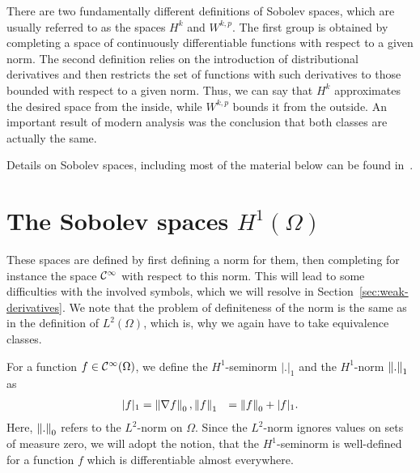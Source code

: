
\begin{intro}
  There are two fundamentally different definitions of Sobolev spaces,
  which are usually referred to as the spaces $H^k$ and $W^{k,p}$. The
  first group is obtained by completing a space of continuously
  differentiable functions with respect to a given norm. The second
  definition relies on the introduction of distributional derivatives
  and then restricts the set of functions with such derivatives to
  those bounded with respect to a given norm. Thus, we can say that
  $H^k$ approximates the desired space from the inside, while
  $W^{k,p}$ bounds it from the outside. An important result of modern
  analysis was the conclusion that both classes are actually the same.

  Details on Sobolev spaces, including most of the material below can
  be found in~\cite{AdamsFournier03}.
\end{intro}

\section{The Sobolev spaces $H^1(\Omega)$}
\label{sec:h1}

\begin{intro}
  These spaces are defined by first defining a norm for them, then
  completing for instance the space $\mathcal C^\infty$ with respect to this
  norm. This will lead to some difficulties with the involved symbols,
  which we will resolve in Section~\ref{sec:weak-derivatives}. We note
  that the problem of definiteness of the norm is the same as in the
  definition of $L^2(\Omega)$, which is, why we again have to take
  equivalence classes.
\end{intro}

\begin{definition}
  For a function $f\in \mathcal C^\infty(\Omega)$, we define the
  $H^1$-seminorm $|.|_1$ and the $H^1$-norm $\left\|.\right\|_1$ as
  \begin{align}
    |f|_1 &= \left\|\nabla f\right\|_0,
    \left\|f\right\|_1 &= \left\|f\right\|_0 + |f|_1.
  \end{align}
  Here, $\left\|.\right\|_0$ refers to the $L^2$-norm on $\Omega$. Since
  the $L^2$-norm ignores values on sets of measure zero, we will adopt
  the notion, that the $H^1$-seminorm is well-defined for a function
  $f$ which is differentiable almost everywhere.
\end{definition}


